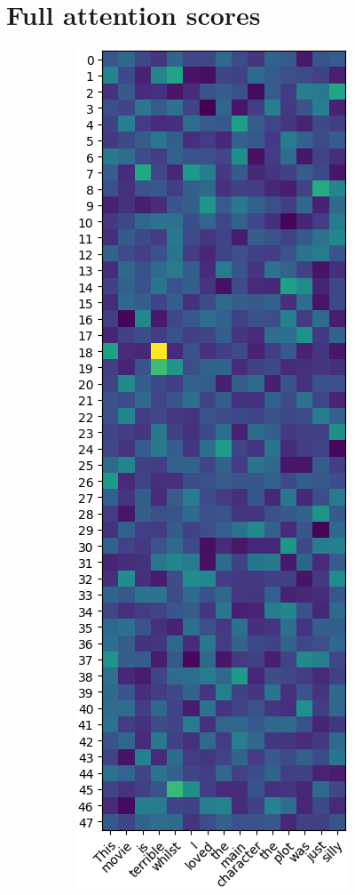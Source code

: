 \section{Full attention scores}\label{appendix:attention}

\begin{figure}[!h]
    \centering
    \begin{subfigure}{.35\textwidth}
        \centering
        \includegraphics[height=0.6\textheight]{imgs/example_1.png}

\end{subfigure}
\end{figure}
